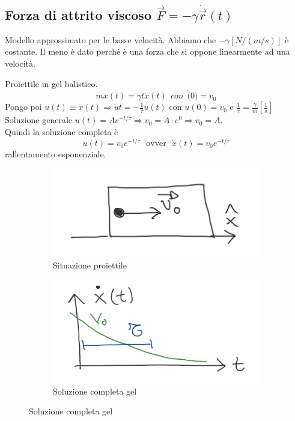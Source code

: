 \subsection{Forza di attrito viscoso $\vec{F} = -\gamma\dot{\vec{r}}(t)$}
Modello approssimato per le basse velocità. Abbiamo che $-\gamma [N/(m/s)]$ è costante. Il meno è dato perché è una forza
che si oppone linearmente ad una velocità.
\begin{example}
    Proiettile in gel balistico.
    $$m\ddot{x}(t) = \gamma t \dot{x}(t) \:\: con \:\: \dot(0) = v_0$$
    Pongo poi $u(t) \equiv \dot{x}(t) \Rightarrow \dot{u} t = -\frac{1}{\tau}u(t)$ con $u(0) = v_0$ e $\frac{1}{\tau} = \frac{\gamma}{m}[\frac{1}{s}]$\\
    Soluzione generale $u(t) = A e^{-t/\tau} \Rightarrow v_0 = A \cdot e^0 \Rightarrow v_0 = A$.\\
    Quindi la soluzione completa è
    $$u(t) = v_0 e^{-t/\tau} \:\:\: \text{ovver} \:\:\: \dot{x}(t) = v_0 e^{-t/\tau}$$
    rallentamento esponenziale.
\end{example}
\begin{figure}[h!]
    \centering
    \begin{subfigure}[b]{0.3\textwidth}
        \centering
        \includegraphics[width=\textwidth]{images/proiettile-gel-balistico-1.png}
        \caption*{Situazione proiettile}
    \end{subfigure}
    \begin{subfigure}[b]{0.3\textwidth}
        \centering
        \includegraphics[width=\textwidth]{images/proiettile-gel-balitstico-2.png}
        \caption*{Soluzione completa gel}
    \end{subfigure}
\end{figure}

